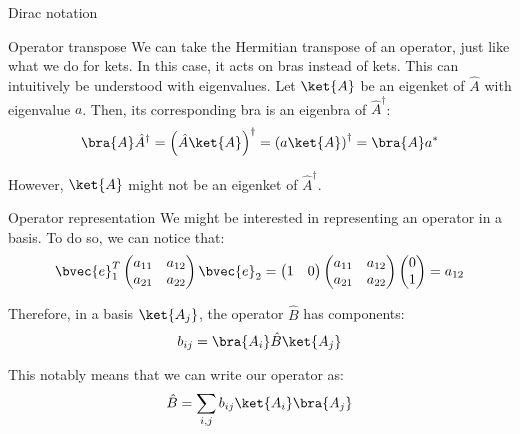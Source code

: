 \documentclass[a4paper]{article}
\begin{document}
\begin{parag}{Dirac notation}
    \begin{subparag}{Operator transpose}
        We can take the Hermitian transpose of an operator, just like what we do for kets. In this case, it acts on bras instead of kets. This can intuitively be understood with eigenvalues. Let $\ket{A}$ be an eigenket of $\hat{A}$ with eigenvalue $a$. Then, its corresponding bra is an eigenbra of $\hat{A}^{\dagger}$: 
        \[\bra{A} \hat{A}^{\dagger} = \left(\hat{A} \ket{A}\right)^{\dagger} = \left(a \ket{A}\right)^{\dagger} = \bra{A} a^*\]
        
        However, $\ket{A}$ might not be an eigenket of $\hat{A}^{\dagger}$.
    \end{subparag}
    
    \begin{subparag}{Operator representation}
        We might be interested in representing an operator in a basis. To do so, we can notice that: 
        \[\bvec{e}_{1}^T \begin{pmatrix} a_{11} & a_{12} \\ a_{21} & a_{22} \end{pmatrix} \bvec{e}_2 = \begin{pmatrix} 1 & 0 \end{pmatrix} \begin{pmatrix} a_{11} & a_{12} \\ a_{21} & a_{22} \end{pmatrix} \begin{pmatrix} 0 \\ 1 \end{pmatrix} = a_{12}\]

        Therefore, in a basis $\ket{A_j}$, the operator $\hat{B}$ has components: 
        \[b_{ij} = \bra{A_i} \hat{B} \ket{A_j}\]
        
        This notably means that we can write our operator as: 
        \[\hat{B} = \sum_{i, j} b_{ij}\ket{A_i} \bra{A_j}\]
        

\end{subparag}
\end{parag}
\end{document}
